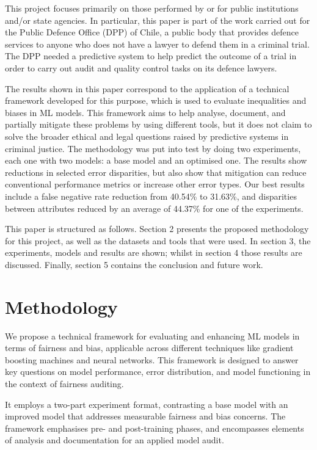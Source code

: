 \documentclass[fleqn,10pt]{wlscirep}
\begin{document}
This project focuses primarily on those performed by or for public institutions and/or state agencies. In particular, this paper is part of the work carried out for the Public Defence Office (DPP) of Chile, a public body that provides defence services to anyone who does not have a lawyer to defend them in a criminal trial. The DPP needed a predictive system to help predict the outcome of a trial in order to carry out audit and quality control tasks on its defence lawyers.

The results shown in this paper correspond to the application of a technical framework developed for this purpose, which is used to evaluate inequalities and biases in ML models. This framework aims to help analyse, document, and partially mitigate these problems by using different tools, but it does not claim to solve the broader ethical and legal questions raised by predictive systems in criminal justice. The methodology was put into test by doing two experiments, each one with two models: a base model and an optimised one. The results show reductions in selected error disparities, but also show that mitigation can reduce conventional performance metrics or increase other error types. Our best results include a false negative rate reduction from 40.54\% to 31.63\%, and disparities between attributes reduced by an average of 44.37\% for one of the experiments.

This paper is structured as follows. Section 2 presents the proposed methodology for this project, as well as the datasets and tools that were used. In section 3, the experiments, models and results are shown; whilst in section 4 those results are discussed. Finally, section 5 contains the conclusion and future work.


\section{Methodology}
\label{methods}

We propose a technical framework for evaluating and enhancing ML models in terms of fairness and bias, applicable across different techniques like gradient boosting machines and neural networks. This framework is designed to answer key questions on model performance, error distribution, and model functioning in the context of fairness auditing.

It employs a two-part experiment format, contrasting a base model with an improved model that addresses measurable fairness and bias concerns. The framework emphasises pre- and post-training phases, and encompasses elements of analysis and documentation for an applied model audit.
\end{document}
